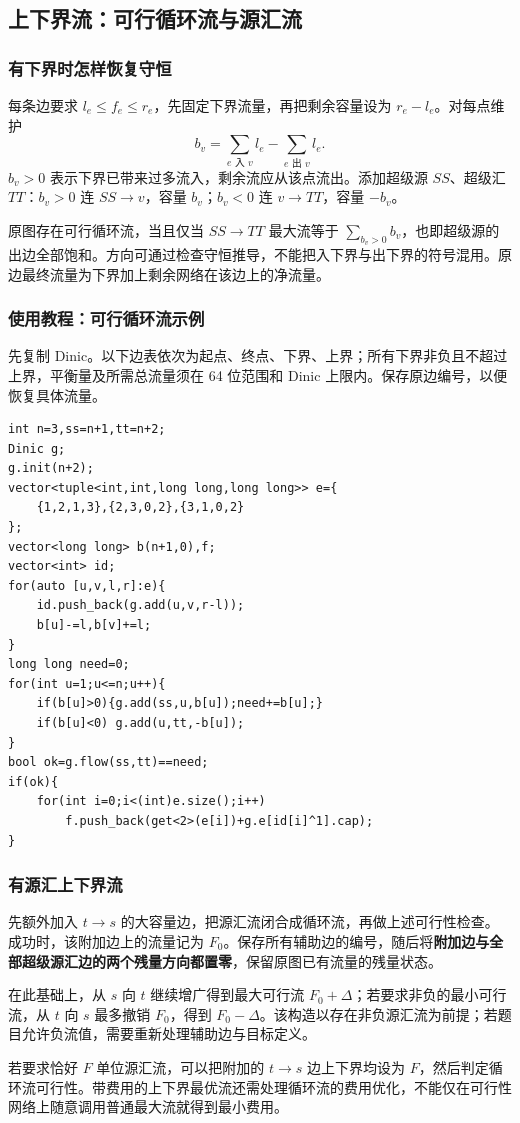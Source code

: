 \subsection{上下界流：可行循环流与源汇流}
\label{math:bounded-flow}
\subsubsection*{有下界时怎样恢复守恒}
每条边要求 $l_e\leq f_e\leq r_e$，先固定下界流量，再把剩余容量设为 $r_e-l_e$。对每点维护
\[
    b_v=\sum_{e\text{ 入 }v}l_e-\sum_{e\text{ 出 }v}l_e.
\]
$b_v>0$ 表示下界已带来过多流入，剩余流应从该点流出。添加超级源 $SS$、超级汇 $TT$：$b_v>0$ 连 $SS\to v$，容量 $b_v$；$b_v<0$ 连 $v\to TT$，容量 $-b_v$。

原图存在可行循环流，当且仅当 $SS\to TT$ 最大流等于 $\sum_{b_v>0}b_v$，也即超级源的出边全部饱和。方向可通过检查守恒推导，不能把入下界与出下界的符号混用。原边最终流量为下界加上剩余网络在该边上的净流量。

\subsubsection*{使用教程：可行循环流示例}
先复制 Dinic。以下边表依次为起点、终点、下界、上界；所有下界非负且不超过上界，平衡量及所需总流量须在 64 位范围和 Dinic 上限内。保存原边编号，以便恢复具体流量。
\begin{lstlisting}[style=mtycpp,numbers=none]
int n=3,ss=n+1,tt=n+2;
Dinic g;
g.init(n+2);
vector<tuple<int,int,long long,long long>> e={
	{1,2,1,3},{2,3,0,2},{3,1,0,2}
};
vector<long long> b(n+1,0),f;
vector<int> id;
for(auto [u,v,l,r]:e){
	id.push_back(g.add(u,v,r-l));
	b[u]-=l,b[v]+=l;
}
long long need=0;
for(int u=1;u<=n;u++){
	if(b[u]>0){g.add(ss,u,b[u]);need+=b[u];}
	if(b[u]<0) g.add(u,tt,-b[u]);
}
bool ok=g.flow(ss,tt)==need;
if(ok){
	for(int i=0;i<(int)e.size();i++)
		f.push_back(get<2>(e[i])+g.e[id[i]^1].cap);
}
\end{lstlisting}

\subsubsection*{有源汇上下界流}
先额外加入 $t\to s$ 的大容量边，把源汇流闭合成循环流，再做上述可行性检查。成功时，该附加边上的流量记为 $F_0$。保存所有辅助边的编号，随后将\textbf{附加边与全部超级源汇边的两个残量方向都置零}，保留原图已有流量的残量状态。

在此基础上，从 $s$ 向 $t$ 继续增广得到最大可行流 $F_0+\Delta$；若要求非负的最小可行流，从 $t$ 向 $s$ 最多撤销 $F_0$，得到 $F_0-\Delta$。该构造以存在非负源汇流为前提；若题目允许负流值，需要重新处理辅助边与目标定义。

若要求恰好 $F$ 单位源汇流，可以把附加的 $t\to s$ 边上下界均设为 $F$，然后判定循环流可行性。带费用的上下界最优流还需处理循环流的费用优化，不能仅在可行性网络上随意调用普通最大流就得到最小费用。

